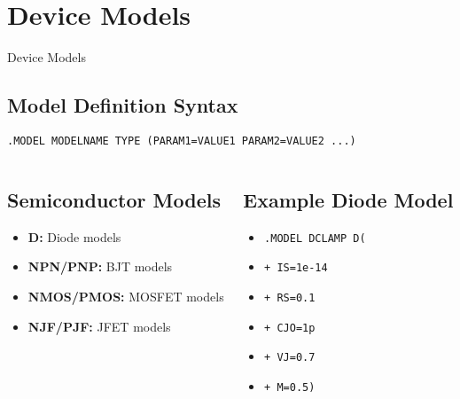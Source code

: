 \documentclass{beamer}
\begin{document}
\section{Device Models}

\begin{frame}{Device Models}
    \subsection{Model Definition Syntax}
    \texttt{.MODEL MODELNAME TYPE (PARAM1=VALUE1 PARAM2=VALUE2 ...)}
    
    \begin{columns}
        \begin{column}{0.5\textwidth}
            \subsection{Semiconductor Models}
            \begin{itemize}
                \item \textbf{D:} Diode models
                \item \textbf{NPN/PNP:} BJT models
                \item \textbf{NMOS/PMOS:} MOSFET models
                \item \textbf{NJF/PJF:} JFET models
            \end{itemize}
        \end{column}
        \begin{column}{0.5\textwidth}
            \subsection{Example Diode Model}
            \begin{itemize}
                \item \texttt{.MODEL DCLAMP D(}
                \item \texttt{+ IS=1e-14}
                \item \texttt{+ RS=0.1}
                \item \texttt{+ CJO=1p}
                \item \texttt{+ VJ=0.7}
                \item \texttt{+ M=0.5)}
            \end{itemize}
        \end{column}
    \end{columns}
\end{frame}
\end{document}
